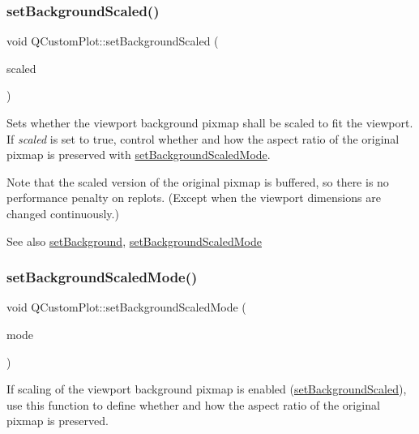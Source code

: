 \subsubsection{\texorpdfstring{setBackgroundScaled()}{setBackgroundScaled()}}
{\footnotesize\ttfamily void Q\+Custom\+Plot\+::set\+Background\+Scaled (\begin{DoxyParamCaption}\item[{bool}]{scaled }\end{DoxyParamCaption})}

Sets whether the viewport background pixmap shall be scaled to fit the viewport. If {\itshape scaled} is set to true, control whether and how the aspect ratio of the original pixmap is preserved with \mbox{\hyperlink{class_q_custom_plot_a4c0eb4865b7949f62e1cb97db04a3de0}{set\+Background\+Scaled\+Mode}}.

Note that the scaled version of the original pixmap is buffered, so there is no performance penalty on replots. (Except when the viewport dimensions are changed continuously.)

\begin{DoxySeeAlso}{See also}
\mbox{\hyperlink{class_q_custom_plot_a130358592cfca353ff3cf5571b49fb00}{set\+Background}}, \mbox{\hyperlink{class_q_custom_plot_a4c0eb4865b7949f62e1cb97db04a3de0}{set\+Background\+Scaled\+Mode}} 
\end{DoxySeeAlso}
\mbox{\label{class_q_custom_plot_a4c0eb4865b7949f62e1cb97db04a3de0}} 
\subsubsection{\texorpdfstring{setBackgroundScaledMode()}{setBackgroundScaledMode()}}
{\footnotesize\ttfamily void Q\+Custom\+Plot\+::set\+Background\+Scaled\+Mode (\begin{DoxyParamCaption}\item[{Qt\+::\+Aspect\+Ratio\+Mode}]{mode }\end{DoxyParamCaption})}

If scaling of the viewport background pixmap is enabled (\mbox{\hyperlink{class_q_custom_plot_a36f0fa1317325dc7b7efea615ee2de1f}{set\+Background\+Scaled}}), use this function to define whether and how the aspect ratio of the original pixmap is preserved.

